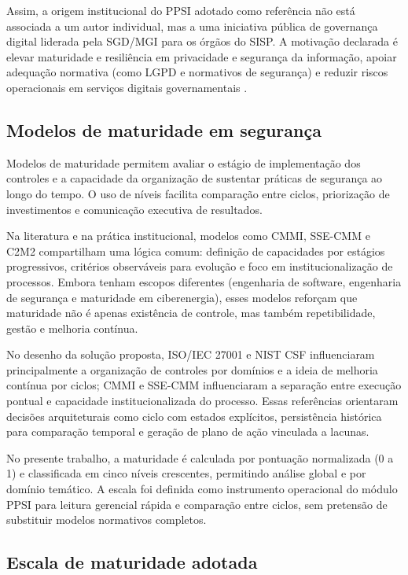 \documentclass[12pt]{article}
\begin{document}
Assim, a origem institucional do PPSI adotado como referência não está associada a um autor individual, mas a uma iniciativa pública de governança digital liderada pela SGD/MGI para os órgãos do SISP. A motivação declarada é elevar maturidade e resiliência em privacidade e segurança da informação, apoiar adequação normativa (como LGPD e normativos de segurança) e reduzir riscos operacionais em serviços digitais governamentais \cite{mgi_cartilha_ppsi,mgi_framework_ppsi}.

\subsection{Modelos de maturidade em segurança}

Modelos de maturidade permitem avaliar o estágio de implementação dos controles e a capacidade da organização de sustentar práticas de segurança ao longo do tempo. O uso de níveis facilita comparação entre ciclos, priorização de investimentos e comunicação executiva de resultados.

Na literatura e na prática institucional, modelos como CMMI, SSE-CMM e C2M2 compartilham uma lógica comum: definição de capacidades por estágios progressivos, critérios observáveis para evolução e foco em institucionalização de processos. Embora tenham escopos diferentes (engenharia de software, engenharia de segurança e maturidade em ciberenergia), esses modelos reforçam que maturidade não é apenas existência de controle, mas também repetibilidade, gestão e melhoria contínua.

No desenho da solução proposta, ISO/IEC 27001 e NIST CSF influenciaram principalmente a organização de controles por domínios e a ideia de melhoria contínua por ciclos; CMMI e SSE-CMM influenciaram a separação entre execução pontual e capacidade institucionalizada do processo. Essas referências orientaram decisões arquiteturais como ciclo com estados explícitos, persistência histórica para comparação temporal e geração de plano de ação vinculada a lacunas.

No presente trabalho, a maturidade é calculada por pontuação normalizada (0 a 1) e classificada em cinco níveis crescentes, permitindo análise global e por domínio temático. A escala foi definida como instrumento operacional do módulo PPSI para leitura gerencial rápida e comparação entre ciclos, sem pretensão de substituir modelos normativos completos.

\subsection{Escala de maturidade adotada}
\end{document}
